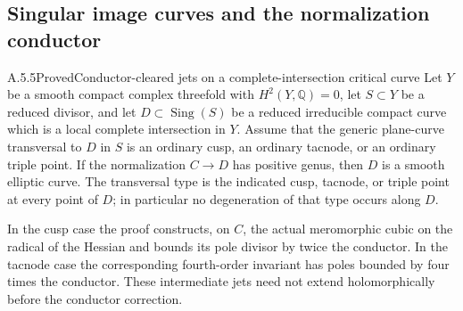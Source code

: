 \subsection{Singular image curves and the normalization conductor}

\begin{statement}{A.5.5}{Proved}{Conductor-cleared jets on a complete-intersection critical curve}
Let $Y$ be a smooth compact complex threefold with
$H^2(Y,\mathbb Q)=0$, let $S\subset Y$ be a reduced divisor,
and let $D\subset\operatorname{Sing}(S)$ be a reduced
irreducible compact curve which is a local complete intersection
in $Y$. Assume that the generic plane-curve transversal to $D$
in $S$ is an ordinary cusp, an ordinary tacnode, or an ordinary
triple point.
If the normalization $C\to D$ has positive genus, then $D$ is
a smooth elliptic curve. The transversal type is the indicated
cusp, tacnode, or triple point at every point of $D$;
in particular no degeneration of that type occurs along $D$.

In the cusp case the proof constructs, on $C$, the actual
meromorphic cubic on the radical of the Hessian and bounds its
pole divisor by twice the conductor. In the tacnode case the
corresponding fourth-order invariant has poles bounded by four
times the conductor. These intermediate jets need not extend
holomorphically before the conductor correction.
\end{statement}
